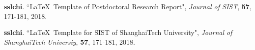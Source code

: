 \begin{publications}{99}
\item {\bf sslchi}. 
``\LaTeX\ Template of Postdoctoral Research Report",  {\em Journal of SIST}, {\bf 57}, 171-181, 2018.
\item {\bf sslchi}. 
``\LaTeX\ Template for SIST of ShanghaiTech University",  {\em Journal of ShanghaiTech Universiy}, {\bf 57}, 171-181, 2018.
\end{publications}